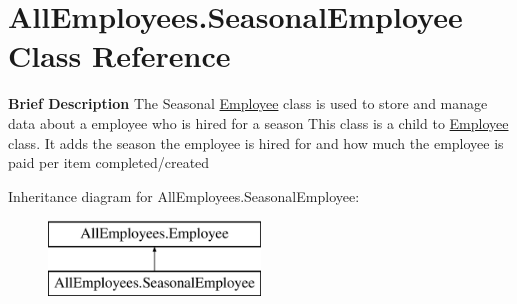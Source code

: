 \hypertarget{class_all_employees_1_1_seasonal_employee}{}\section{All\+Employees.\+Seasonal\+Employee Class Reference}
\label{class_all_employees_1_1_seasonal_employee}


{\bfseries Brief Description} The Seasonal \hyperlink{class_all_employees_1_1_employee}{Employee} class is used to store and manage data about a employee who is hired for a season This class is a child to \hyperlink{class_all_employees_1_1_employee}{Employee} class. It adds the season the employee is hired for and how much the employee is paid per item completed/created  


Inheritance diagram for All\+Employees.\+Seasonal\+Employee\+:\begin{figure}[H]
\begin{center}
\leavevmode
\includegraphics[height=2.000000cm]{class_all_employees_1_1_seasonal_employee}
\end{center}
\end{figure}
